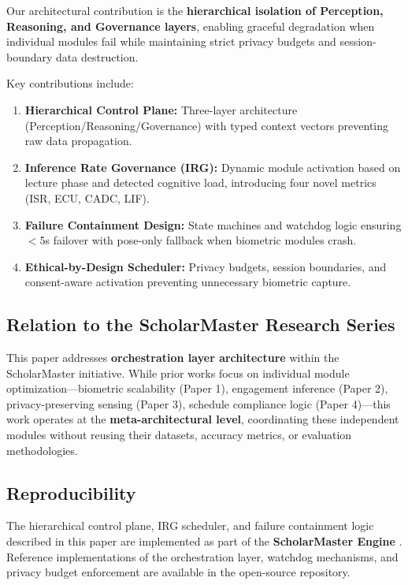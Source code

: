 \documentclass[conference]{IEEEtran}
\begin{document}
Our architectural contribution is the \textbf{hierarchical isolation of Perception, Reasoning, and Governance layers}, enabling graceful degradation when individual modules fail while maintaining strict privacy budgets and session-boundary data destruction.

Key contributions include:
\begin{enumerate}
    \item \textbf{Hierarchical Control Plane:} Three-layer architecture (Perception/Reasoning/Governance) with typed context vectors preventing raw data propagation.
    \item \textbf{Inference Rate Governance (IRG):} Dynamic module activation based on lecture phase and detected cognitive load, introducing four novel metrics (ISR, ECU, CADC, LIF).
    \item \textbf{Failure Containment Design:} State machines and watchdog logic ensuring $<$5s failover with pose-only fallback when biometric modules crash.
    \item \textbf{Ethical-by-Design Scheduler:} Privacy budgets, session boundaries, and consent-aware activation preventing unnecessary biometric capture.
\end{enumerate}

\subsection{Relation to the ScholarMaster Research Series}
This paper addresses \textbf{orchestration layer architecture} within the ScholarMaster initiative. While prior works focus on individual module optimization—biometric scalability (Paper 1), engagement inference (Paper 2), privacy-preserving sensing (Paper 3), schedule compliance logic (Paper 4)—this work operates at the \textbf{meta-architectural level}, coordinating these independent modules without reusing their datasets, accuracy metrics, or evaluation methodologies.

\subsection{Reproducibility}
The hierarchical control plane, IRG scheduler, and failure containment logic described in this paper are implemented as part of the \textbf{ScholarMaster Engine} \cite{scholarmaster_repo}. Reference implementations of the orchestration layer, watchdog mechanisms, and privacy budget enforcement are available in the open-source repository.
\end{document}
